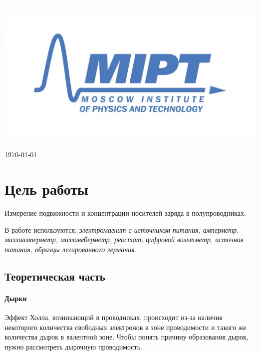 \documentclass[a4paper, 12pt]{article}
\newenvironment{bottompar}{\par\vspace*{\fill}}{\clearpage}
\begin{document}
\begin{titlepage}
\begin{bottompar}
	\begin{center}
		\includegraphics[width = 80 mm]{logo.jpg}
	\end{center}
	{\large \today}

\end{bottompar}
\vfill %

\end{titlepage}

\section{Цель работы}
Измерение подвижности и концентрации носителей заряда в полупроводниках.

В работе используются: \textit{электромагнит с источником питания, амперметр, миллиамперметр, милливеберметр, реостат, цифровой вольтметр, источник питания, образцы легированного германия.}


\subsection*{Теоретическая часть}

\paragraph{Дырки}

Эффект Холла, возникающий в проводниках, происходит из-за наличия некоторого количества свободных электронов в зоне проводимости и такого же количества дырок в валентной зоне. Чтобы понять причину образования дырок, нужно рассмотреть дырочную проводимость.
\end{document}
